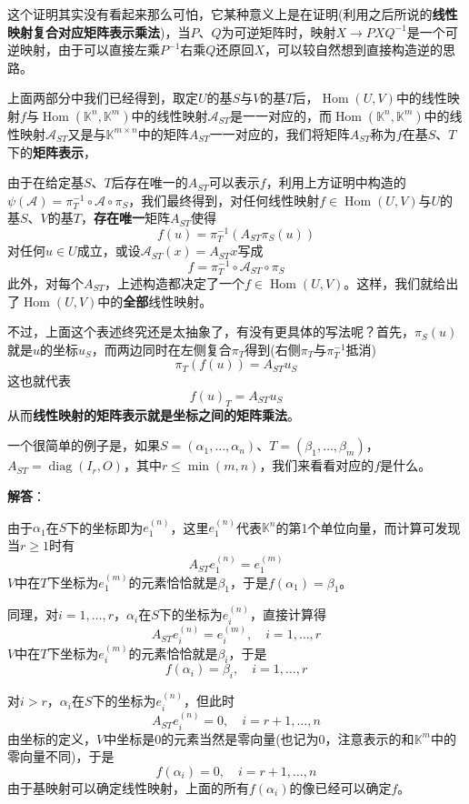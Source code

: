 \documentclass[a4paper,UTF8,fontset=windows,AutoFakeBold]{ctexart}
\DeclareMathOperator{\diag}{diag}
\DeclareMathOperator{\Hom}{Hom}
\newcommand*{\ma}{\mathcal{A}}
\newcommand*{\note}{\noindent *}
\newcommand{\sol}[1]{{\vspace{5pt}\kaishu\noindent\textbf{解答}：\vspace{-3pt}
\begin{compactitem}
    \item[] #1
\end{compactitem}
}}
\begin{document}
\begin{enumerate}
    \note 这个证明其实没有看起来那么可怕，它某种意义上是在证明(利用之后所说的\textbf{线性映射复合对应矩阵表示乘法})，当$P$、$Q$为可逆矩阵时，映射$X\to PXQ^{-1}$是一个可逆映射，由于可以直接左乘$P^{-1}$右乘$Q$还原回$X$，可以较自然想到直接构造逆的思路。
\end{enumerate}

上面两部分中我们已经得到，取定$U$的基$S$与$V$的基$T$后，$\Hom(U,V)$中的线性映射$f$与$\Hom(\mathbb{K}^n,\mathbb{K}^m)$中的线性映射$\ma_{ST}$是一一对应的，而$\Hom(\mathbb{K}^n,\mathbb{K}^m)$中的线性映射$\ma_{ST}$又是与$\mathbb{K}^{m\times n}$中的矩阵$A_{ST}$一一对应的，我们将矩阵$A_{ST}$称为$f$在基$S$、$T$下的\textbf{矩阵表示}，

由于在给定基$S$、$T$后存在唯一的$A_{ST}$可以表示$f$，利用上方证明中构造的$\psi(\ma)=\pi_T^{-1}\circ\ma\circ\pi_S$，我们最终得到，对任何线性映射$f\in\Hom(U,V)$与$U$的基$S$、$V$的基$T$，\textbf{存在唯一}矩阵$A_{ST}$使得
$$f(u)=\pi_T^{-1}(A_{ST}\pi_S(u))$$
对任何$u\in U$成立，或设$\ma_{ST}(x)=A_{ST}x$写成
$$f=\pi_T^{-1}\circ\ma_{ST}\circ\pi_S$$
此外，对每个$A_{ST}$，上述构造都决定了一个$f\in\Hom(U,V)$。这样，我们就给出了$\Hom(U,V)$中的\textbf{全部}线性映射。

不过，上面这个表述终究还是太抽象了，有没有更具体的写法呢？首先，$\pi_S(u)$就是$u$的坐标$u_S$，而两边同时在左侧复合$\pi_T$得到(右侧$\pi_T$与$\pi_T^{-1}$抵消)
$$\pi_T(f(u))=A_{ST}u_S$$
这也就代表
$$f(u)_T=A_{ST}u_S$$
从而\textbf{线性映射的矩阵表示就是坐标之间的矩阵乘法}。

一个很简单的例子是，如果$S=(\alpha_1,\dots,\alpha_n)$、$T=(\beta_1,\dots,\beta_m)$，$A_{ST}=\diag(I_r,O)$，其中$r\le\min(m,n)$，我们来看看对应的$f$是什么。

\sol{
    由于$\alpha_1$在$S$下的坐标即为$e_1^{(n)}$，这里$e_1^{(n)}$代表$\mathbb{K}^n$的第1个单位向量，而计算可发现当$r\ge1$时有
    $$A_{ST}e_1^{(n)}=e_1^{(m)}$$
    $V$中在$T$下坐标为$e_1^{(m)}$的元素恰恰就是$\beta_1$，于是$f(\alpha_1)=\beta_1$。

    同理，对$i=1,\dots,r$，$\alpha_i$在$S$下的坐标为$e_i^{(n)}$，直接计算得
    $$A_{ST}e_i^{(n)}=e_i^{(m)},\quad i=1,\dots,r$$
    $V$中在$T$下坐标为$e_i^{(m)}$的元素恰恰就是$\beta_i$，于是
    $$f(\alpha_i)=\beta_i,\quad i=1,\dots,r$$

    对$i>r$，$\alpha_i$在$S$下的坐标为$e_i^{(n)}$，但此时
    $$A_{ST}e_i^{(n)}=0,\quad i=r+1,\dots,n$$
    由坐标的定义，$V$中坐标是0的元素当然是零向量(也记为0，注意表示的和$\mathbb{K}^m$中的零向量不同)，于是
    $$f(\alpha_i)=0,\quad i=r+1,\dots,n$$
    由于基映射可以确定线性映射，上面的所有$f(\alpha_i)$的像已经可以确定$f$。
}
\end{document}
